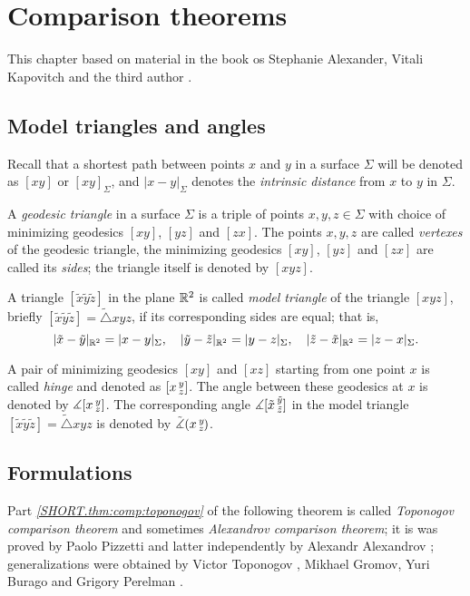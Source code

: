 \chapter{Comparison theorems}

This chapter based on material in the book os Stephanie Alexander, Vitali Kapovitch and the third author \cite{alexander-kapovitch-petrunin2027}.

\section{Model triangles and angles}

Recall that a shortest path between points $x$ and $y$ in a surface $\Sigma$ will be denoted as $[xy]$ or $[xy]_\Sigma$, and
$|x-y|_\Sigma$ denotes the \emph{intrinsic distance} from $x$ to $y$ in $\Sigma$.

A \emph{geodesic triangle} in a surface $\Sigma$ is a triple of points $x,y,z\in \Sigma$ with choice of minimizing geodesics $[xy]$, $[yz]$ and $[zx]$.
The points $x,y,z$ are called {}\emph{vertexes} of the geodesic triangle,
the minimizing geodesics $[xy]$, $[yz]$ and $[zx]$ are called its {}\emph{sides};
the triangle itself is denoted by $[xyz]$.

A triangle $[\tilde x\tilde y\tilde z]$ in the plane $\mathbb{R}^2$ is called \emph{model triangle} of the triangle $[xyz]$,
briefly $[\tilde x\tilde y\tilde z]=\tilde\triangle xyz$,
\index{$\tilde\triangle$}
if its corresponding sides are equal;
that is,
\[|\tilde x-\tilde y|_{\mathbb{R}^2}=|x-y|_\Sigma,
\quad
|\tilde y-\tilde z|_{\mathbb{R}^2}=|y-z|_\Sigma,
\quad
|\tilde z-\tilde x|_{\mathbb{R}^2}=|z-x|_\Sigma.
\]

A pair of minimizing geodesics $[xy]$ and $[xz]$ starting from one point $x$ is called \emph{hinge} and denoted as $[x\,{}^{y}_{z}]$.
The angle between these geodesics at $x$ is denoted by $\measuredangle[x\,{}^{y}_{z}]$.
The corresponding angle $\measuredangle[\tilde x\,{}^{\tilde y}_{\tilde z}]$ in the model triangle $[\tilde x\tilde y\tilde z]=\tilde\triangle xyz$ is denoted by $\tilde\measuredangle(x\,{}^{y}_{z}\hspace{-0.2ex})$.

\section{Formulations}

Part \textit{\ref{SHORT.thm:comp:toponogov}} of the following theorem is called \emph{Toponogov comparison theorem} and sometimes \emph{Alexandrov comparison theorem};
it is was proved by Paolo Pizzetti \cite{pizzetti} and latter independently by Alexandr Alexandrov \cite{alexandrov}; 
generalizations were obtained by  Victor Toponogov \cite{toponogov1957}, Mikhael Gromov, Yuri Burago and Grigory Perelman \cite{burago-gromov-perelman}.

